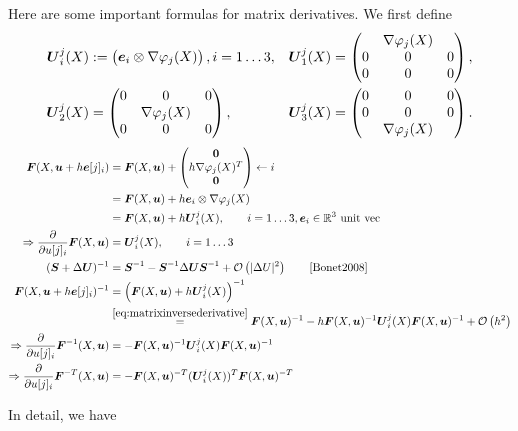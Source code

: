 Here are some important formulas for matrix derivatives. We first define
\begin{align}
    \boldsymbol{U}^j_i(X) & := \left(\begin{matrix}\boldsymbol{e}_i\otimes\nabla\varphi_{j}(X)\end{matrix}\right), i=1\ldots3, &
	\boldsymbol{U}^j_1(X) &= \left(\begin{matrix}
            ~   & \nabla\varphi_{j}(X)  & ~ \\
            0   & 0                 & 0 \\
            0   & 0                 & 0
          \end{matrix}\right),\\
  \boldsymbol{U}^j_2(X) &= \left(\begin{matrix}
            0   & 0                 & 0 \\
            ~   & \nabla\varphi_{j}(X)  & ~ \\            
            0   & 0                 & 0
          \end{matrix}\right),& 
  \boldsymbol{U}^j_3(X) & = \left(\begin{matrix}
            0   & 0                 & 0 \\
            0   & 0                 & 0 \\
            ~   & \nabla\varphi_{j}(X)  & ~            
          \end{matrix}\right).
\end{align}
\begin{align}
	\vF(X,\vu + h\ve[j]_i) &= \vF(X,\vu) + \m{\vnull \\ h\dpj^T\\ \vnull}\leftarrow i\nonumber\\
	&= \vF(X,\vu) + h\ve_i\otimes\dpj\\
	&= \vF(X,\vu) + h\vU^j_i(X),\qquad i=1\ldots3,\ve_i\in\R^3 \text{ unit vec}\nonumber\\
	\Rightarrow \d{}{u[j]_i}\vF(X,\vu) &= \vU^j_i(X),\qquad i=1\ldots3\nonumber\\
	(\vS+\Delta\vU)^{-1} &= \vS^{-1} - \vS^{-1}\Delta\vU\vS^{-1} + \O{|\Delta U|^2}\qquad\cite[p.57]{Bonet2008}\label{eq:matrixinversederivative}\\
	\vF(X,\vu + h\ve[j]_i)^{-1} &= \left(\vF(X,\vu) + h\vU^j_i(X)\right)^{-1}\nonumber\\
		&\re{eq:matrixinversederivative}\vF(X,\vu)^{-1} - h\vF(X,\vu)^{-1}\vU^j_i(X)\vF(X,\vu)^{-1} + \O{h^2}\nonumber\\
	\Rightarrow\d{}{u[j]_i}\vF^{-1}(X,\vu) &= -\vF(X,\vu)^{-1}\vU^j_i(X)\vF(X,\vu)^{-1}\nonumber\\
	\Rightarrow\d{}{u[j]_i}\vF^{-T}(X,\vu) &= -\vF(X,\vu)^{-T}(\vU^j_i(X))^{T}\vF(X,\vu)^{-T}\nonumber
\end{align}

In detail, we have
